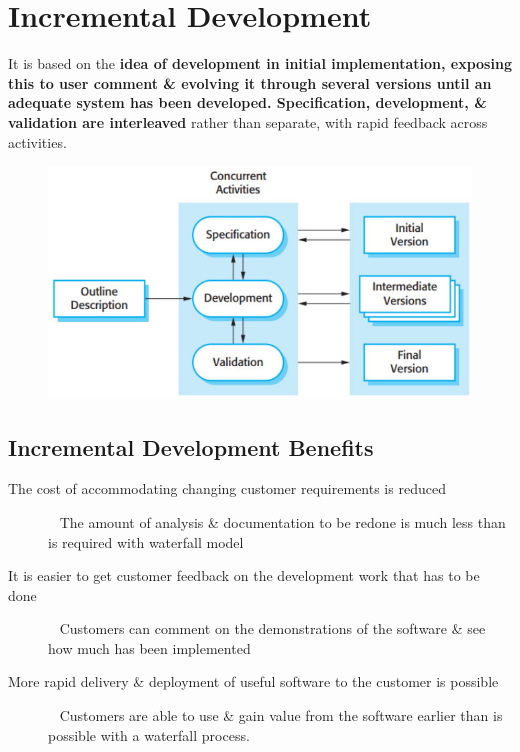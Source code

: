 \documentclass{report}
\begin{document}
\section{Incremental Development}
\vspace{-1em}
\begin{multicols}{2}
\noindent It is based on the \textbf{idea of development in initial implementation, exposing this to user comment \& evolving it through several versions until an adequate system has been developed. Specification, development, \& validation are interleaved} rather than separate, with rapid feedback across activities.
\begin{figure}[H]
\centering
\includegraphics[scale=.3,trim=1cm 1cm 1cm 1cm]{assets/CEN4010_Incremental_Development.jpg}
\end{figure}
\end{multicols}

\subsection{Incremental Development Benefits}
\begin{description}
  \item [The cost of accommodating changing customer requirements is reduced] \ \newline
  The amount of analysis \& documentation to be redone is much less than is required with waterfall model
  \item [It is easier to get customer feedback on the development work that has to be done] \ \newline
  Customers can comment on the demonstrations of the software \& see how much has been implemented
  \item [More rapid delivery \& deployment of useful software to the customer is possible] \ \newline
  Customers are able to use \& gain value from the software earlier than is possible with a waterfall process.
\end{description}
\end{document}

